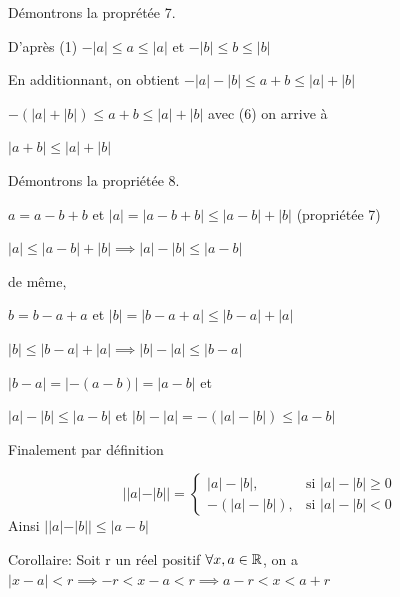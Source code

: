 \documentclass[a4paper, 12pt]{article}
\begin{document}
Démontrons la proprétée 7.

\begin{demonstration}
    D'après (1) \quad
    $-|a| \leq a \leq |a|$ et $-|b| \leq b \leq |b|$
    
    En additionnant, on obtient $-|a|-|b| \leq a + b \leq |a| + |b|$

    $-(|a|+|b|) \leq a + b \leq |a| + |b|$ avec (6) on arrive à

    $|a + b| \leq |a| + |b|$
\end{demonstration}

Démontrons la propriétée 8.

\begin{demonstration}
    $a = a - b + b$ \quad et \quad $|a| = |a - b + b| \leq |a - b| + |b|$ (propriétée 7)

    $|a| \leq |a - b| + |b| \implies |a| - |b| \leq |a - b|$

    \vspace{0.5em}
    de même, 
    \vspace{0.5em}
    
    $b = b - a + a$ \quad et \quad $|b| = |b - a + a| \leq |b - a| + |a|$
    
    $|b| \leq |b - a| + |a| \implies |b| - |a| \leq |b - a|$
    
    \vspace{0.5em}

    $|b - a| = |-(a-b)| = |a-b|$ et
    
    $|a| - |b| \leq |a-b|$ \quad et \quad $|b| - |a| = -(|a| - |b|) \leq |a-b|$

    Finalement par définition

    \begin{rdem}
        \begin{equation*}
            ||a|-|b|| =
            \begin{cases}
                |a| - |b|, & \text{si } |a| - |b| \geq 0 \\
                -(|a| - |b|), & \text{si } |a| - |b| \lt 0
            \end{cases}
        \end{equation*}
        Ainsi $||a| - |b|| \leq |a - b|$
    \end{rdem}
\end{demonstration}

Corollaire: Soit r un réel positif $\forall x, a \in \mathbb{R}$, on a 
$|x - a| \lt r \implies -r \lt x - a \lt r \implies a-r \lt x \lt a + r$
\end{document}
